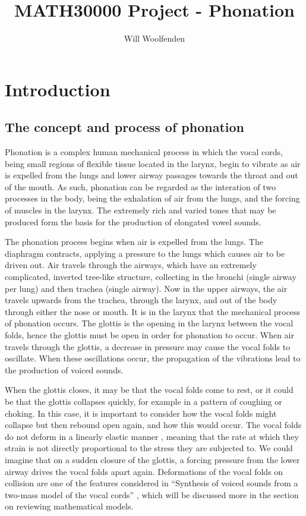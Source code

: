 \documentclass{book}
\title{MATH30000 Project - Phonation}
\author{Will Woolfenden}
\begin{document}
\maketitle

\chapter{Introduction}

\section{The concept and process of phonation}

Phonation is a complex human mechanical process in which the vocal cords, being small regions of flexible tissue located in the larynx,
begin to vibrate as air is expelled from the lungs and lower airway passages towards the throat and out of the mouth.
As such, phonation can be regarded as the interation of two processes in the body,
being the exhalation of air from the lungs,
and the forcing of muscles in the larynx.
The extremely rich and varied tones that may be produced form the basis for the production of elongated vowel sounds.

The phonation process begins when air is expelled from the lungs.
The diaphragm contracts, applying a pressure to the lungs which causes air to be driven out.
Air travels through the airways, which have an extremely complicated, inverted tree-like structure,
collecting in the bronchi (single airway per lung) and then trachea (single airway).
Now in the upper airways, the air travels upwards from the trachea, through the larynx, and out of the body through either the nose or mouth.
It is in the larynx that the mechanical process of phonation occurs.
The glottis is the opening in the larynx between the vocal folds,
hence the glottis must be open in order for phonation to occur.
When air travels through the glottis,
a decrease in pressure may cause the vocal folds to oscillate.
When these oscillations occur,
the propagation of the vibrations lead to the production of voiced sounds.

When the glottis closes, it may be that the vocal folds come to rest,
or it could be that the glottis collapses quickly, for example in a pattern of coughing or choking.
In this case, it is important to consider how the vocal folds might collapse but then rebound open again,
and how this would occur.
The vocal folds do not deform in a linearly elastic manner \cite{alipour_2012},
meaning that the rate at which they strain is not directly proportional to the stress they are subjected to.
We could imagine that on a sudden closure of the glottis,
a forcing pressure from the lower airway drives the vocal folds apart again.
Deformations of the vocal folds on collision are one of the features considered in ``Synthesis of voiced sounds from a two-mass model of the vocal cords'' \cite{ishizaka_flanagan_1972},
which will be discussed more in the section on reviewing mathematical models.
\end{document}
